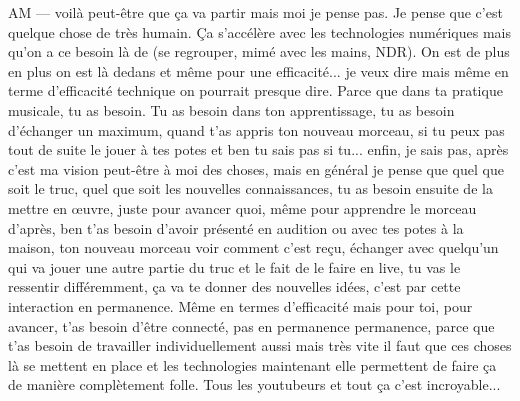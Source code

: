 AM — voilà peut-être que ça va partir mais moi je pense pas. Je pense que c'est quelque chose de très humain. Ça s'accélère avec les technologies numériques mais qu'on a ce besoin là de (se regrouper, mimé avec les mains, NDR). On est de plus en plus on est là dedans et même pour une efficacité... je veux dire mais même en terme d'efficacité technique on pourrait presque dire. Parce que dans ta pratique musicale, tu as besoin. Tu as besoin dans ton apprentissage, tu as besoin d'échanger un maximum, quand t'as appris ton nouveau morceau, si tu peux pas tout de suite le jouer à tes potes et ben tu sais pas si tu... enfin, je sais pas, après c'est ma vision peut-être à moi des choses, mais en général je pense que quel que soit le truc, quel que soit les nouvelles connaissances, tu as besoin ensuite de la mettre en œuvre, juste pour avancer quoi, même pour apprendre le morceau d'après, ben t'as besoin d'avoir présenté en audition ou avec tes potes à la maison, ton nouveau morceau voir comment c'est reçu, échanger avec quelqu'un qui va jouer une autre partie du truc et le fait de le faire en live, tu vas le ressentir différemment, ça va te donner des nouvelles idées, c'est par cette interaction en permanence. Même en termes d'efficacité mais pour toi, pour avancer, t'as besoin d'être connecté, pas en permanence permanence, parce que t'as besoin de travailler individuellement aussi mais très vite il faut que ces choses là se mettent en place et les technologies maintenant elle permettent de faire ça de manière complètement folle. Tous les youtubeurs et tout ça c'est incroyable... 

